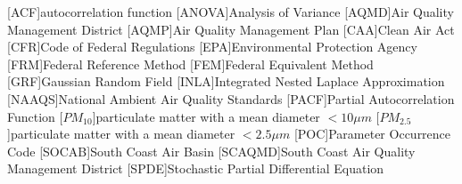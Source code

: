 \begin{acronym}
    [ACF]{autocorrelation function}
    [ANOVA]{Analysis of Variance}
    [AQMD]{Air Quality Management District}
    [AQMP]{Air Quality Management Plan}
    [CAA]{Clean Air Act}
    [CFR]{Code of Federal Regulations}
    [EPA]{Environmental Protection Agency}
    [FRM]{Federal Reference Method}
    [FEM]{Federal Equivalent Method}
    [GRF]{Gaussian Random Field}
    [INLA]{Integrated Nested Laplace Approximation}
    [NAAQS]{National Ambient Air Quality Standards}
    [PACF]{Partial Autocorrelation Function}
    [$PM_{10}$]{particulate matter with a mean diameter $<10 \mu m$}
    [$PM_{2.5}$]{particulate matter with a mean diameter $<2.5 \mu m$}
    [POC]{Parameter Occurrence Code}
    [SOCAB]{South Coast Air Basin}
    [SCAQMD]{South Coast Air Quality Management District}
    [SPDE]{Stochastic Partial Differential Equation}
\end{acronym}




